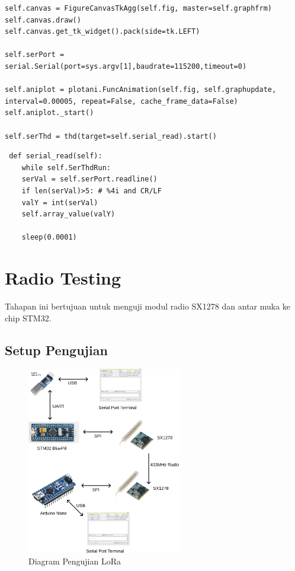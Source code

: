 \documentclass{book} %
\begin{document}
	\begin{verbatim}
self.canvas = FigureCanvasTkAgg(self.fig, master=self.graphfrm)
self.canvas.draw()
self.canvas.get_tk_widget().pack(side=tk.LEFT)

self.serPort = serial.Serial(port=sys.argv[1],baudrate=115200,timeout=0)

self.aniplot = plotani.FuncAnimation(self.fig, self.graphupdate, interval=0.00005, repeat=False, cache_frame_data=False)
self.aniplot._start()

self.serThd = thd(target=self.serial_read).start()
	\end{verbatim}
	
	\begin{verbatim}
 def serial_read(self):
	while self.SerThdRun:
	serVal = self.serPort.readline()
	if len(serVal)>5: # %4i and CR/LF
	valY = int(serVal)
	self.array_value(valY)
	
	sleep(0.0001)
	\end{verbatim}
	
	\newpage
	\section{Radio Testing}
	
	Tahapan ini bertujuan untuk menguji modul radio SX1278 dan antar muka ke chip STM32.
	
	\subsection{Setup Pengujian}
	
	\begin{figure}[!ht]
		\centering
		\includegraphics[width=0.6\textwidth]{images/lora/tesLora.png}
		\caption{Diagram Pengujian LoRa}
	\end{figure}
	
\end{document}
